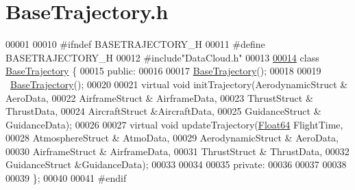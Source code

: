 \hypertarget{_base_trajectory_8h_source}{}\section{Base\+Trajectory.\+h}
\label{_base_trajectory_8h_source}

\begin{DoxyCode}
00001 
00010 \textcolor{preprocessor}{#ifndef BASETRAJECTORY\_H}
00011 \textcolor{preprocessor}{#define BASETRAJECTORY\_H}
00012 \textcolor{preprocessor}{#include"DataCloud.h"}
00013 
\hyperlink{group___trajectory}{00014} \textcolor{keyword}{class }\hyperlink{group___trajectory_class_base_trajectory}{BaseTrajectory} \{
00015 \textcolor{keyword}{public}:
00016 
00017     \hyperlink{group___trajectory_class_base_trajectory}{BaseTrajectory}();
00018 
00019     ~\hyperlink{group___trajectory_class_base_trajectory}{BaseTrajectory}();
00020 
00021     \textcolor{keyword}{virtual} \textcolor{keywordtype}{void} initTrajectory(AerodynamicStruct & AeroData,
00022                         AirframeStruct & AirframeData,
00023                         ThrustStruct & ThrustData,
00024                         AircraftStruct &AircraftData, 
00025                         GuidanceStruct & GuidanceData);
00026 
00027     \textcolor{keyword}{virtual} \textcolor{keywordtype}{void} updateTrajectory(\hyperlink{group___tools_ga3f1431cb9f76da10f59246d1d743dc2c}{Float64} FlightTime,
00028                             AtmosphereStruct & AtmoData,
00029                             AerodynamicStruct & AeroData,
00030                             AirframeStruct & AirframeData,
00031                             ThrustStruct & ThrustData,
00032                             GuidanceStruct &GuidanceData);
00033 
00034 
00035 \textcolor{keyword}{private}:
00036     
00037 
00038 
00039 \};
00040 
00041 \textcolor{preprocessor}{#endif}
\end{DoxyCode}
